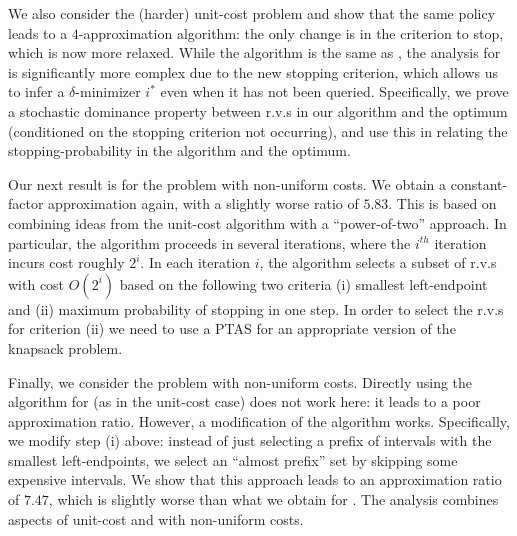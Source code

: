 \documentclass[11pt]{article}
\theoremstyle{remark}
\theoremstyle{plain}
\theoremstyle{remark}
\begin{document}
We also consider the (harder) unit-cost \smqi problem and show that the  same policy leads to a $4$-approximation  algorithm: the only change is in the criterion to stop, which is now more relaxed. While the algorithm is the same as \smq, the analysis for \smqi is significantly more complex due to the new stopping criterion, which allows us to infer a $\delta$-minimizer $i^*$ even when it has not been queried. Specifically, we prove a stochastic dominance property between r.v.s in our algorithm and the optimum (conditioned on the \smq stopping criterion not occurring), and use this  in  relating the \smqi stopping-probability   in the algorithm and the optimum.       

Our next result is for the \smq problem with non-uniform costs. We obtain a constant-factor approximation again, with a slightly worse ratio of $5.83$.  This is based on combining ideas from the unit-cost algorithm with a ``power-of-two'' approach. In particular, the algorithm proceeds in several iterations, where the $i^{th}$ iteration incurs cost roughly $2^i$. In each iteration $i$, the algorithm selects a subset of r.v.s with cost $O(2^i)$ based on the following two criteria (i) smallest left-endpoint and (ii) maximum  probability of stopping in one step. In order to select the r.v.s for criterion (ii) we need to use a PTAS for an appropriate version of the knapsack problem. 

Finally, we consider  the \smqi problem with non-uniform costs.  Directly using the \smq algorithm for \smqi (as in the unit-cost case) does not work here: it leads to a poor approximation ratio. However, a modification of the \smq algorithm works. Specifically, we modify step (i) above: instead of just selecting a prefix of intervals with the smallest 
left-endpoints, we select an ``almost prefix'' set by skipping some expensive intervals.  We show that this approach leads to an approximation ratio of  $7.47$, which is slightly worse than what we obtain for \smq.  The analysis combines aspects of unit-cost \smqi  
and \smq with non-uniform costs.
\end{document}
